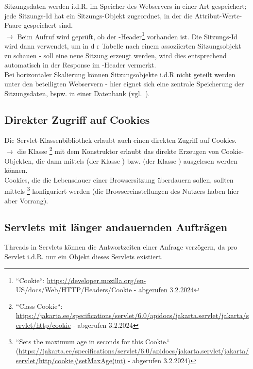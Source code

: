 \noindent
Sitzungsdaten werden i.d.R. im Speicher des Webservers in einer Art  gespeichert; jede Sitzungs-Id hat ein Sitzungs-Objekt zugeordnet, in der die Attribut-Werte-Paare gespeichert sind.\\

$\rightarrow$ Beim Aufruf  wird geprüft, ob der -Header\footnote{
    ``Cookie``: \url{https://developer.mozilla.org/en-US/docs/Web/HTTP/Headers/Cookie} - abgerufen 3.2.2024
} vorhanden ist.
Die Sitzungs-Id wird dann verwendet, um in d r Tabelle nach einem assoziierten Sitzungsobjekt zu schauen - soll eine neue Sitzung erzeugt werden, wird dies entsprechend automatisch in der Response im -Header vermerkt.\\

\noindent
Bei horizontaler Skalierung können Sitzungsobjekte i.d.R nicht geteilt werden unter den beteiligten Webservern - hier eignet sich eine zentrale Speicherung der Sitzungsdaten, bspw. in einer Datenbank (vgl.~\cite[433]{Oec22}).

\subsection{Direkter Zugriff auf Cookies}
Die Servlet-Klassenbibliothek erlaubt auch einen direkten Zugriff auf Cookies.\\

\noindent
$\rightarrow$ die Klasse \footnote{
``Class Cookie``: \url{https://jakarta.ee/specifications/servlet/6.0/apidocs/jakarta.servlet/jakarta/servlet/http/cookie} - abgerufen 3.2.2024
} mit dem Konstruktor  erlaubt das direkte Erzeugen von Cookie-Objekten, die dann mittels  (der Klasse ) bzw.  (der Klasse ) ausgelesen werden können.\\

\noindent
Cookies, die die Lebensdauer einer Browsersitzung überdauern sollen, sollten mittels \footnote{
    ``Sets the maximum age in seconds for this Cookie.`` (\url{https://jakarta.ee/specifications/servlet/6.0/apidocs/jakarta.servlet/jakarta/servlet/http/cookie#setMaxAge(int)} - abgerufen 3.2.2024)
} konfiguriert werden (die Browsereinstellungen des Nutzers haben hier aber Vorrang).

\subsection{Servlets mit länger andauernden Aufträgen}
Threads in Servlets können die Antwortzeiten einer Anfrage verzögern, da pro Servlet i.d.R. nur ein Objekt dieses Servlets existiert.\\

